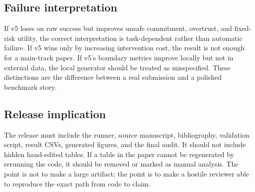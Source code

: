 \documentclass{article}
\begin{document}
\subsection{Failure interpretation}
If v5 loses on raw success but improves unsafe commitment, overtrust, and fixed-risk utility, the correct interpretation is task-dependent rather than automatic failure. If v5 wins only by increasing intervention cost, the result is not enough for a main-track paper. If v5's boundary metrics improve locally but not in external data, the local generator should be treated as misspecified. These distinctions are the difference between a real submission and a polished benchmark story.

\subsection{Release implication}
The release must include the runner, source manuscript, bibliography, validation script, result CSVs, generated figures, and the final audit. It should not include hidden hand-edited tables. If a table in the paper cannot be regenerated by rerunning the code, it should be removed or marked as manual analysis. The point is not to make a large artifact; the point is to make a hostile reviewer able to reproduce the exact path from code to claim.


\begingroup
\raggedright
\nocite{*}


\endgroup
\end{document}
